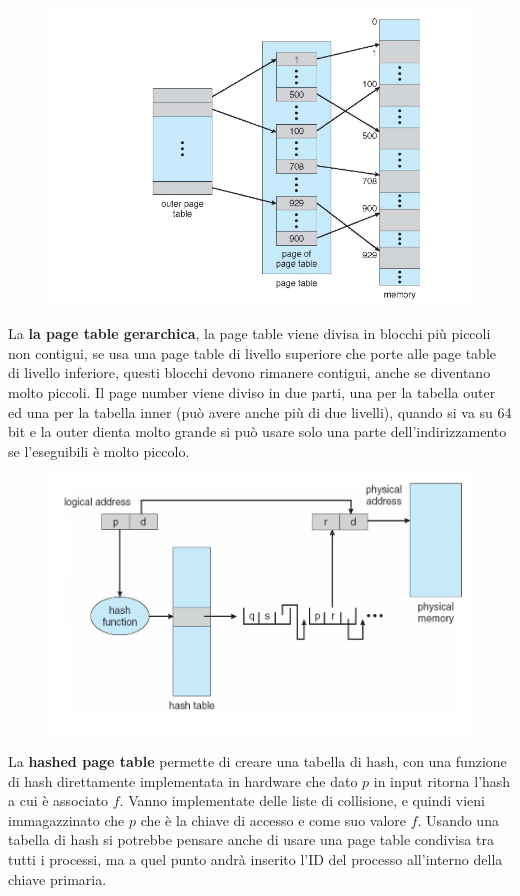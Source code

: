 \documentclass[12pt]{article}
\begin{document}
\begin{figure}
  \centering
  \includegraphics[width=1\linewidth]{page-table-gerarchica.png}
\end{figure}
La \textbf{la page table gerarchica}, la page table viene divisa in blocchi pi\`u piccoli non contigui, se usa una page table di livello superiore che porte alle page table di livello inferiore, questi blocchi devono rimanere contigui, anche se diventano molto piccoli. Il page number viene diviso in due parti, una per la tabella outer ed una per la tabella inner (pu\`o avere anche pi\`u di due livelli), quando si va su 64 bit e la outer dienta molto grande si pu\`o usare solo una parte dell'indirizzamento se l'eseguibili \`e molto piccolo.

\begin{figure}
  \centering
  \includegraphics[width=1\linewidth]{hashed-page-table.png}
\end{figure}
La \textbf{hashed page table} permette di creare una tabella di hash, con una funzione di hash direttamente implementata in hardware che dato $p$ in input ritorna l'hash a cui \`e associato $f$. Vanno implementate delle liste di collisione, e quindi vieni immagazzinato che $p$ che \`e la chiave di accesso e come suo valore $f$. Usando una tabella di hash si potrebbe pensare anche di usare una page table condivisa tra tutti i processi, ma a quel punto andr\`a inserito l'ID del processo all'interno della chiave primaria.
\end{document}
